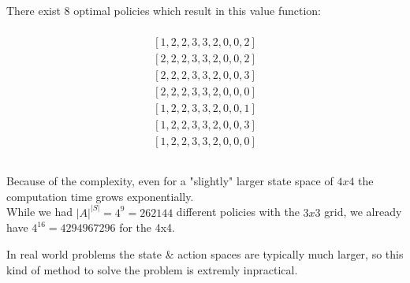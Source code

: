 \documentclass[11pt,a4paper]{article}
\begin{document}
\vspace{10pt}

There exist $8$ optimal policies which result in this value function:

\begin{align*}
[2, 2, 2, 3, 3, 2, 0, 0, 1]\\
[1, 2, 2, 3, 3, 2, 0, 0, 2]\\
[2, 2, 2, 3, 3, 2, 0, 0, 2]\\
[2, 2, 2, 3, 3, 2, 0, 0, 3]\\
[2, 2, 2, 3, 3, 2, 0, 0, 0]\\
[1, 2, 2, 3, 3, 2, 0, 0, 1]\\
[1, 2, 2, 3, 3, 2, 0, 0, 3]\\
[1, 2, 2, 3, 3, 2, 0, 0, 0]
\end{align*}


\subsection{}

Because of the complexity, even for a "slightly" larger state space of $4x4$ the computation time grows exponentially.\\
While we had $|A|^{|S|}=4^9=262144$ different policies with the $3x3$ grid, we already have $4^{16}=4294967296$ for the 4x4.\\

\vspace{10pt}

In real world problems the state \& action spaces are typically much larger, so this kind of method to solve the problem
is extremly inpractical.
\end{document}
